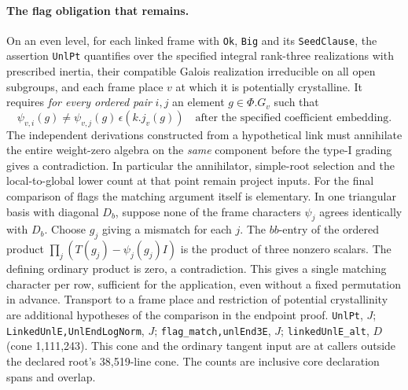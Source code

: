\paragraph{The flag obligation that remains.}
On an even level, for each linked frame with \nolinkurl{Ok}, \nolinkurl{Big}
and its \nolinkurl{SeedClause}, the assertion \nolinkurl{UnlPt} quantifies
over the specified integral rank-three realizations with prescribed inertia,
their compatible Galois realization irreducible on all open subgroups, and
each frame place $v$ at which it is potentially crystalline. It requires
\emph{for every ordered pair} $i,j$ an element $g\in\Phi.G_v$ such that
\[
 \psi_{v,i}(g)\ne\psi_{v,j}(g)\,\epsilon(k.j_v(g))
 \quad\text{after the specified coefficient embedding.}
\]
The independent derivations constructed from a hypothetical link must
annihilate the entire weight-zero algebra on the \emph{same} component
before the type-I grading gives a contradiction. In particular the
annihilator, simple-root selection and the local-to-global lower count at
that point remain project inputs. For the final comparison of flags the
matching argument itself is elementary. In one triangular basis with
diagonal $D_b$, suppose none of the frame characters $\psi_j$ agrees
identically with $D_b$. Choose $g_j$ giving a mismatch for each $j$.
The $bb$-entry of the ordered product
$\prod_j(T(g_j)-\psi_j(g_j)I)$ is the product of three nonzero scalars.
The defining ordinary product is zero, a contradiction. This gives a
single matching character per row, sufficient for the application, even
without a fixed permutation in advance. Transport to a frame place and
restriction of potential crystallinity are additional hypotheses of the
comparison in the endpoint proof.
\nolinkurl{UnlPt}, $J$;
\nolinkurl{LinkedUnlE,UnlEndLogNorm}, $J$;
\nolinkurl{flag_match,unlEnd3E}, $J$;
\nolinkurl{linkedUnlE_alt}, $D$
(cone 1,111,243). This cone and the ordinary tangent input are at callers
outside the declared root's 38,519-line cone. The counts are inclusive
core declaration spans and overlap.


